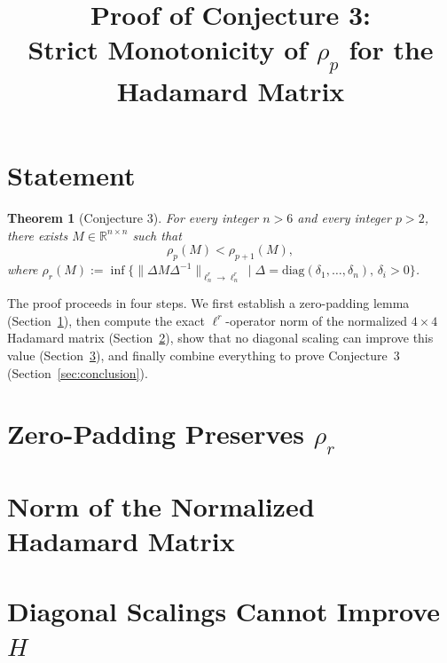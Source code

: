 \documentclass{article}
\title{Proof of Conjecture 3:\\
Strict Monotonicity of $\rho_p$ for the Hadamard Matrix}
\author{}
\date{}
\newtheorem{theorem}{Theorem}
\begin{document}
\maketitle

\section*{Statement}

\begin{theorem}[Conjecture 3]\label{thm:conj3}
For every integer $n>6$ and every integer $p>2$, there exists $M\in\mathbb{R}^{n\times n}$ such that
\[
\rho_p(M) < \rho_{p+1}(M),
\]
where $\rho_r(M):=\inf\bigl\{\|\Delta M\Delta^{-1}\|_{\ell^r_n\to\ell^r_n} \mid \Delta=\mathrm{diag}(\delta_1,\dots,\delta_n),\,\delta_i>0\bigr\}$.
\end{theorem}

The proof proceeds in four steps. We first establish a zero-padding lemma (Section~\ref{sec:padding}), then compute the exact $\ell^r$-operator norm of the normalized $4\times4$ Hadamard matrix (Section~\ref{sec:hadamard}), show that no diagonal scaling can improve this value (Section~\ref{sec:scaling}), and finally combine everything to prove Conjecture~3 (Section~\ref{sec:conclusion}).

\section{Zero-Padding Preserves $\rho_r$}
\label{sec:padding}



\section{Norm of the Normalized Hadamard Matrix}
\label{sec:hadamard}



\section{Diagonal Scalings Cannot Improve $H$}
\label{sec:scaling}
\end{document}
